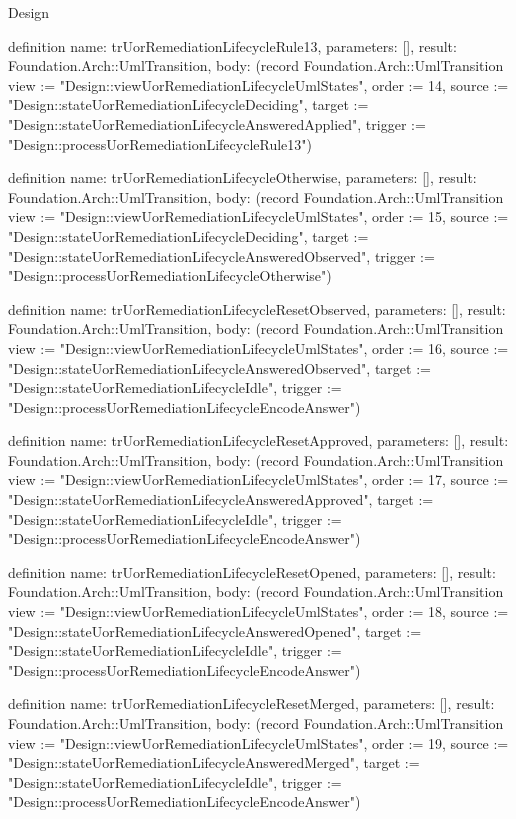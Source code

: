 \begin{lexlean}{Design}
\begin{semanticmodule}
definition{
  name: trUorRemediationLifecycleRule13,
  parameters: [],
  result: Foundation.Arch::UmlTransition,
  body: (record Foundation.Arch::UmlTransition {view := "Design::viewUorRemediationLifecycleUmlStates", order := 14, source := "Design::stateUorRemediationLifecycleDeciding", target := "Design::stateUorRemediationLifecycleAnsweredApplied", trigger := "Design::processUorRemediationLifecycleRule13"})
}

definition{
  name: trUorRemediationLifecycleOtherwise,
  parameters: [],
  result: Foundation.Arch::UmlTransition,
  body: (record Foundation.Arch::UmlTransition {view := "Design::viewUorRemediationLifecycleUmlStates", order := 15, source := "Design::stateUorRemediationLifecycleDeciding", target := "Design::stateUorRemediationLifecycleAnsweredObserved", trigger := "Design::processUorRemediationLifecycleOtherwise"})
}

definition{
  name: trUorRemediationLifecycleResetObserved,
  parameters: [],
  result: Foundation.Arch::UmlTransition,
  body: (record Foundation.Arch::UmlTransition {view := "Design::viewUorRemediationLifecycleUmlStates", order := 16, source := "Design::stateUorRemediationLifecycleAnsweredObserved", target := "Design::stateUorRemediationLifecycleIdle", trigger := "Design::processUorRemediationLifecycleEncodeAnswer"})
}

definition{
  name: trUorRemediationLifecycleResetApproved,
  parameters: [],
  result: Foundation.Arch::UmlTransition,
  body: (record Foundation.Arch::UmlTransition {view := "Design::viewUorRemediationLifecycleUmlStates", order := 17, source := "Design::stateUorRemediationLifecycleAnsweredApproved", target := "Design::stateUorRemediationLifecycleIdle", trigger := "Design::processUorRemediationLifecycleEncodeAnswer"})
}

definition{
  name: trUorRemediationLifecycleResetOpened,
  parameters: [],
  result: Foundation.Arch::UmlTransition,
  body: (record Foundation.Arch::UmlTransition {view := "Design::viewUorRemediationLifecycleUmlStates", order := 18, source := "Design::stateUorRemediationLifecycleAnsweredOpened", target := "Design::stateUorRemediationLifecycleIdle", trigger := "Design::processUorRemediationLifecycleEncodeAnswer"})
}

definition{
  name: trUorRemediationLifecycleResetMerged,
  parameters: [],
  result: Foundation.Arch::UmlTransition,
  body: (record Foundation.Arch::UmlTransition {view := "Design::viewUorRemediationLifecycleUmlStates", order := 19, source := "Design::stateUorRemediationLifecycleAnsweredMerged", target := "Design::stateUorRemediationLifecycleIdle", trigger := "Design::processUorRemediationLifecycleEncodeAnswer"})
}


\end{semanticmodule}
\end{lexlean}
